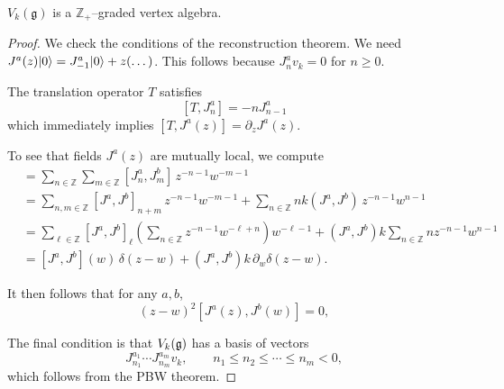 \documentclass[12pt]{article}
\begin{document}
\begin{theorem}
    $V_k(\mathfrak{g})$ is a $\mathbb{Z}_+$–graded vertex algebra.
\end{theorem}

\begin{proof}
    We check the conditions of the reconstruction theorem.
    We need $J^a(z)\lvert 0 \rangle = J^a_{-1}\lvert 0 \rangle + z(\dots)$. This follows because $J^a_n v_k = 0$ for $n\ge0$.

    The translation operator $T$ satisfies \[[T,J^a_n] = -n J^a_{n-1}\] which immediately implies $[T,J^a(z)] = \partial_z J^a(z)$.

    To see that fields $J^a(z)$ are mutually local, we compute \begin{align*}
        [J^a(z),J^b(w)]
         & = \sum_{n\in\mathbb{Z}}\sum_{m\in\mathbb{Z}} [J^a_n, J^b_m]\,z^{-n-1}w^{-m-1} \\[4pt]
         & = \sum_{n,m\in\mathbb{Z}} [J^a,J^b]_{n+m}\,z^{-n-1}w^{-m-1}
        + \sum_{n\in\mathbb{Z}} n k (J^a,J^b)\,z^{-n-1}w^{n-1}                           \\[4pt]
         & = \sum_{\ell\in\mathbb{Z}} [J^a,J^b]_\ell
        \left( \sum_{n\in\mathbb{Z}} z^{-n-1}w^{-\ell+n} \right) w^{-\ell-1}
        + (J^a,J^b)k \sum_{n\in\mathbb{Z}} n z^{-n-1}w^{n-1}                             \\[4pt]
         & = [J^a,J^b](w)\,\delta(z-w)
        + (J^a,J^b)k\,\partial_w\delta(z-w).
    \end{align*}

    It then follows that for any $a,b$,
    \[
        (z-w)^2 [J^a(z),J^b(w)] = 0,
    \]

    The final condition is that $V_k(\mathfrak{g})$ has a basis of vectors
    \[J^{a_1}_{n_1} \cdots J^{a_m}_{n_m} v_k,\qquad n_1\le n_2 \le \cdots \le n_m < 0,\]
    which follows from the PBW theorem.
\end{proof}
\end{document}
